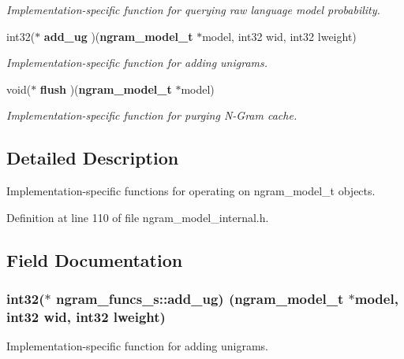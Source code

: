 \begin{DoxyCompactItemize}
\begin{DoxyCompactList}\small\item\em Implementation-\/specific function for querying raw language model probability. \end{DoxyCompactList}\item 
int32($\ast$ {\bf add\+\_\+ug} )({\bf ngram\+\_\+model\+\_\+t} $\ast$model, int32 wid, int32 lweight)
\begin{DoxyCompactList}\small\item\em Implementation-\/specific function for adding unigrams. \end{DoxyCompactList}\item 
void($\ast$ {\bf flush} )({\bf ngram\+\_\+model\+\_\+t} $\ast$model)\label{structngram__funcs__s_af1ab9c61d3b9fa4a4782b8df3089baa6}

\begin{DoxyCompactList}\small\item\em Implementation-\/specific function for purging N-\/\+Gram cache. \end{DoxyCompactList}\end{DoxyCompactItemize}


\subsection{Detailed Description}
Implementation-\/specific functions for operating on ngram\+\_\+model\+\_\+t objects. 

Definition at line 110 of file ngram\+\_\+model\+\_\+internal.\+h.



\subsection{Field Documentation}
\subsubsection[{add\+\_\+ug}]{\setlength{\rightskip}{0pt plus 5cm}int32($\ast$ ngram\+\_\+funcs\+\_\+s\+::add\+\_\+ug) ({\bf ngram\+\_\+model\+\_\+t} $\ast$model, int32 wid, int32 lweight)}\label{structngram__funcs__s_aec7921e64c7cc778fa2267d6717482c3}


Implementation-\/specific function for adding unigrams. 

